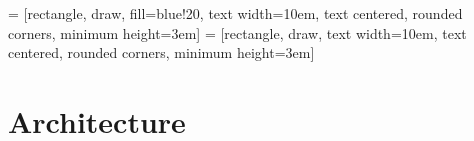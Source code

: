 
 = [rectangle, draw, fill=blue!20, 
    text width=10em, text centered, rounded corners, minimum height=3em]
 = [rectangle, draw, 
    text width=10em, text centered, rounded corners, minimum height=3em]



\section*{Architecture}


